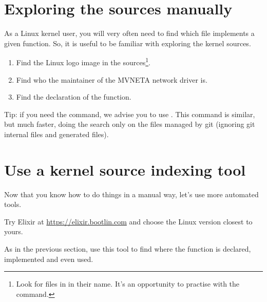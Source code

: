 \section{Exploring the sources manually}

As a Linux kernel user, you will very often need to find which file
implements a given function. So, it is useful to be familiar with
exploring the kernel sources.

\begin{enumerate}
\item Find the Linux logo image in the sources\footnote{Look for
      files in  in their name. It's an
      opportunity to practise with the  command.}.
\item Find who the maintainer of the MVNETA network driver is.
\item Find the declaration of the  function.
\end{enumerate}

Tip: if you need the  command, we advise you to use . This command is similar, but much faster, doing the search only
on the files managed by git (ignoring git internal files and generated
files).

\section{Use a kernel source indexing tool}

Now that you know how to do things in a manual way, let's use more
automated tools.

Try Elixir at \url{https://elixir.bootlin.com}
and choose the Linux version closest to yours.

As in the previous section, use this tool to find where
the  function is declared, implemented and
even used.
